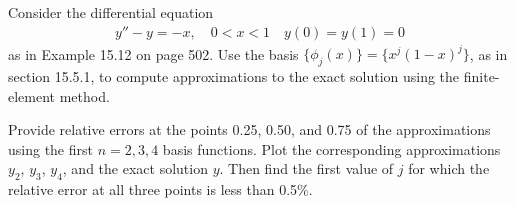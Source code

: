 \begin{problem}
  Consider the differential equation
  \begin{align}\label{diffeq}
    y'' - y = -x,\quad  0<x<1 \quad y(0) = y(1) = 0
  \end{align}
  as in Example 15.12 on page 502.
  Use the basis $\{\phi_j(x)\} = \{x^j(1-x)^j\}$, as in section 15.5.1, to
  compute approximations to the exact solution using the finite-element method.

  Provide relative errors at the points 0.25, 0.50, and 0.75 of the approximations
  using the first $n=2,3,4$ basis functions. Plot
  the corresponding approximations $y_2$, $y_3$, $y_4$, and the exact solution
  $y$. Then find the first value of $j$ for which the relative error at all
  three points is less than 0.5\%.
\end{problem}

